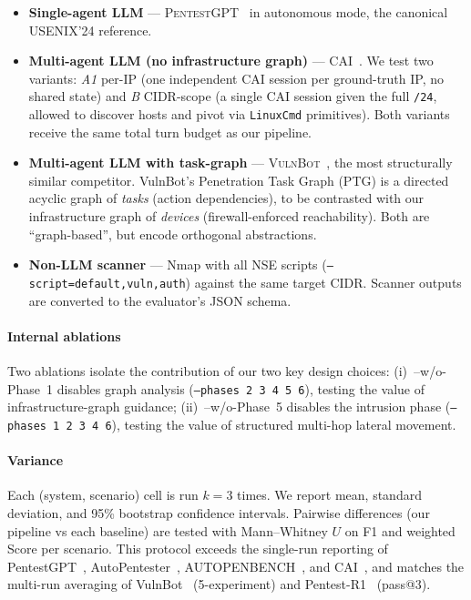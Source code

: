 \begin{itemize}
  \item \textbf{Single-agent LLM} --- \textsc{PentestGPT}~\cite{pentestgpt24}
  in autonomous mode, the canonical USENIX'24 reference.
  \item \textbf{Multi-agent LLM (no infrastructure graph)} ---
  \textsc{CAI}~\cite{cai25}. We test two variants: \emph{A1} per-IP
  (one independent CAI session per ground-truth IP, no shared state) and
  \emph{B} CIDR-scope (a single CAI session given the full \texttt{/24}, allowed
  to discover hosts and pivot via \texttt{LinuxCmd} primitives). Both variants
  receive the same total turn budget as our pipeline.
  \item \textbf{Multi-agent LLM with task-graph} ---
  \textsc{VulnBot}~\cite{vulnbot25}, the most structurally similar competitor.
  VulnBot's Penetration Task Graph (PTG) is a directed acyclic graph of
  \emph{tasks} (action dependencies), to be contrasted with our infrastructure
  graph of \emph{devices} (firewall-enforced reachability). Both are
  ``graph-based'', but encode orthogonal abstractions.
  \item \textbf{Non-LLM scanner} --- Nmap with all NSE scripts
  (\texttt{--script=default,vuln,auth}) against the same target CIDR. Scanner
  outputs are converted to the evaluator's JSON schema.
\end{itemize}

\paragraph{Internal ablations}
Two ablations isolate the contribution of our two key design choices:
(i)~\harnessname--w/o-Phase~1 disables graph analysis (\texttt{--phases 2 3 4 5
6}), testing the value of infrastructure-graph guidance;
(ii)~\harnessname--w/o-Phase~5 disables the intrusion phase (\texttt{--phases 1
2 3 4 6}), testing the value of structured multi-hop lateral movement.

\paragraph{Variance}
Each (system, scenario) cell is run $k{=}3$ times. We report mean, standard
deviation, and 95\% bootstrap confidence intervals. Pairwise differences
(our pipeline vs each baseline) are tested with Mann--Whitney $U$ on F1 and
weighted Score per scenario. This protocol exceeds the single-run reporting of
PentestGPT~\cite{pentestgpt24}, AutoPentester~\cite{autopentester25},
AUTOPENBENCH~\cite{autopenbench24}, and CAI~\cite{cai25}, and matches the
multi-run averaging of VulnBot~\cite{vulnbot25} (5-experiment) and
Pentest-R1~\cite{pentestr125} (pass@3).

